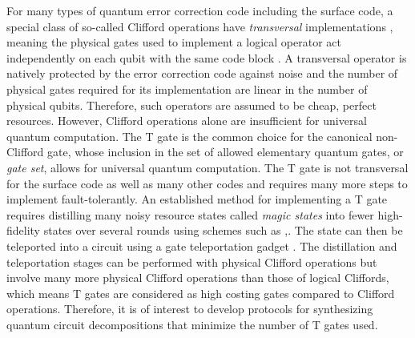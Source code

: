 \documentclass{article}
\theoremstyle{definition}
\theoremstyle{problem}
\theoremstyle{lemma}
\begin{document}
	For many types of quantum error correction code including the surface code, a special class of so-called Clifford operations have \emph{transversal} implementations \cite{38_Dennis_2001}, meaning the physical gates used to implement a logical operator act independently on each qubit with the same code block \cite{30_Gottesman_1997}. A transversal operator is natively protected by the error correction code against noise and the number of physical gates required for its implementation are linear in the number of physical qubits. Therefore, such operators are assumed to be cheap, perfect resources. However, Clifford operations alone are insufficient for universal quantum computation. The T gate is the common choice for the canonical non-Clifford gate, whose inclusion in the set of allowed elementary quantum gates, or \emph{gate set}, allows for universal quantum computation. The T gate is not transversal for the surface code as well as many other codes and requires many more steps to implement fault-tolerantly. An established method for implementing a T gate requires distilling many noisy resource states called \emph{magic states} into fewer high-fidelity states over several rounds using schemes such as \cite{32_Bravyi_2005},\cite{33_Bravyi_2012}. The state can then be teleported into a circuit using a gate teleportation gadget \cite{39_Gottesman_1999}. The distillation and teleportation stages can be performed with physical Clifford operations but involve many more physical Clifford operations than those of logical Cliffords, which means T gates are considered as high costing gates compared to Clifford operations.
	Therefore, it is of interest to develop protocols for synthesizing quantum circuit decompositions that minimize the number of T gates used.%
	
\end{document}
